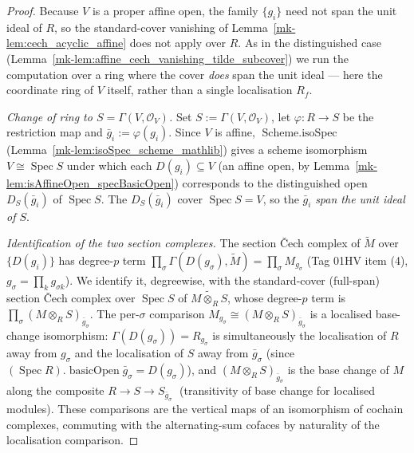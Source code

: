 \begin{proof}
  Because \(V\) is a proper affine open, the family \(\{g_i\}\) need not span the unit ideal of \(R\), so
  the standard-cover vanishing of Lemma~\ref{mk-lem:cech_acyclic_affine} does not apply over \(R\). As in the
  distinguished case (Lemma~\ref{mk-lem:affine_cech_vanishing_tilde_subcover}) we run the computation over a
  ring where the cover \emph{does} span the unit ideal --- here the coordinate ring of \(V\) itself, rather
  than a single localisation \(R_f\).

  \emph{Change of ring to \(S = \Gamma(V, \mathcal{O}_V)\).} Set \(S := \Gamma(V, \mathcal{O}_V)\), let
  \(\varphi : R \to S\) be the restriction map and \(\bar g_i := \varphi(g_i)\). Since \(V\) is affine,
  \(\operatorname{Scheme.isoSpec}\) (Lemma~\ref{mk-lem:isoSpec_scheme_mathlib}) gives a scheme isomorphism
  \(V \cong \operatorname{Spec} S\) under which each \(D(g_i) \subseteq V\) (an affine open, by
  Lemma~\ref{mk-lem:isAffineOpen_specBasicOpen}) corresponds to the distinguished open \(D_S(\bar g_i)\) of
  \(\operatorname{Spec} S\). The \(D_S(\bar g_i)\) cover \(\operatorname{Spec} S = V\), so the \(\bar g_i\)
  \emph{span the unit ideal of \(S\)}.

  \emph{Identification of the two section complexes.} The section {\v C}ech complex of \(\widetilde{M}\)
  over \(\{D(g_i)\}\) has degree-\(p\) term \(\prod_\sigma \Gamma(D(g_\sigma), \widetilde{M}) = \prod_\sigma
  M_{g_\sigma}\) (Tag 01HV item (4), \(g_\sigma = \prod_k g_{\sigma k}\)). We identify it, degreewise, with
  the standard-cover (full-span) section {\v C}ech complex over \(\operatorname{Spec} S\) of
  \(\widetilde{M \otimes_R S}\), whose degree-\(p\) term is \(\prod_\sigma (M \otimes_R S)_{\bar g_\sigma}\).
  The per-\(\sigma\) comparison \(M_{g_\sigma} \cong (M \otimes_R S)_{\bar g_\sigma}\) is a localised
  base-change isomorphism: \(\Gamma(D(g_\sigma)) = R_{g_\sigma}\) is simultaneously the localisation of \(R\)
  away from \(g_\sigma\) and the localisation of \(S\) away from \(\bar g_\sigma\) (since
  \((\operatorname{Spec} R).\operatorname{basicOpen}\bar g_\sigma = D(g_\sigma)\)), and \((M \otimes_R
  S)_{\bar g_\sigma}\) is the base change of \(M\) along the composite \(R \to S \to S_{\bar g_\sigma}\;\)
  (transitivity of base change for localised modules). These comparisons are the vertical maps of an
  isomorphism of cochain complexes, commuting with the alternating-sum cofaces by naturality of the
  localisation comparison.


\end{proof}

